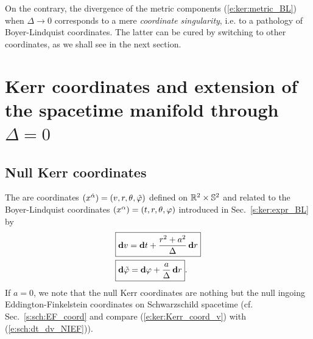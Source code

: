 On the contrary, the divergence
of the metric components (\ref{e:ker:metric_BL})
when $\Delta\rightarrow 0$ corresponds to
a mere \emph{coordinate singularity},
i.e. to a pathology of Boyer-Lindquist coordinates. The latter can be cured by switching to
other coordinates, as we shall see in the next section.


\section{Kerr coordinates and extension of the spacetime ma\-ni\-fold through $\Delta=0$}
\label{s:ker:extension}

\subsection{Null Kerr coordinates} \label{s:ker:Kerr_coord}

The  are coordinates
$(x^{\hat{\alpha}}) = (v,r,\theta,{\tilde\varphi})$ defined on $\mathbb{R}^2\times\mathbb{S}^2$ and related to the Boyer-Lindquist coordinates
$(x^\alpha) = (t,r,\theta,\varphi)$ introduced in Sec.~\ref{s:ker:expr_BL} by
\begin{subequations}
\label{e:ker:Kerr_coord}
\begin{align}
& \fbox{$\displaystyle \mathbf{d} v = \mathbf{d} t + \frac{r^2+a^2}{\Delta} \, \mathbf{d} r$} \label{e:ker:Kerr_coord_v}\\
& \fbox{$\displaystyle \mathbf{d} {\tilde\varphi} = \mathbf{d} \varphi + \frac{a}{\Delta}\, \mathbf{d} r$} . \label{e:ker:Kerr_coord_tph}
\end{align}
\end{subequations}
If $a=0$, we note that the null Kerr coordinates are nothing but the null
ingoing Eddington-Finkelstein
coordinates on Schwarzschild spacetime (cf. Sec.~\ref{s:sch:EF_coord} and compare
(\ref{e:ker:Kerr_coord_v}) with (\ref{e:sch:dt_dv_NIEF})).

